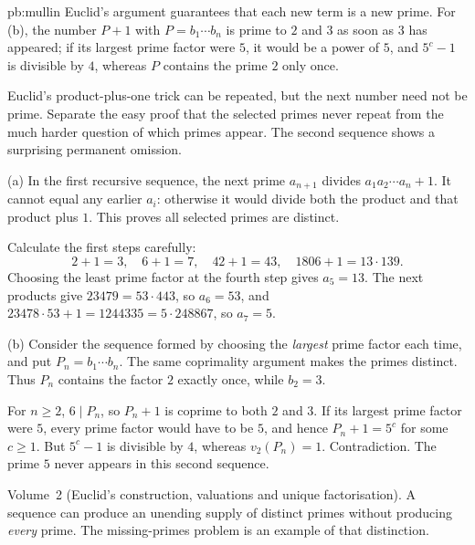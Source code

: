 \begin{solution}{pb:mullin}
\idea Euclid's argument guarantees that each new term is a new prime. For (b), the number $P+1$ with $P=b_1\cdots b_n$ is prime to
$2$ and $3$ as soon as $3$ has appeared; if its largest prime factor were $5$, it would be a power of $5$, and $5^c-1$ is
divisible by $4$, whereas $P$ contains the prime $2$ only once.

\writeup
Euclid's product-plus-one trick can be repeated, but the next number need not be prime. Separate the easy proof that the selected primes never repeat from the much harder question of which primes appear. The second sequence shows a surprising permanent omission.

 (a) In the first recursive sequence, the next prime $a_{n+1}$ divides
$a_1a_2\cdots a_n+1$. It cannot equal any earlier $a_i$: otherwise it would divide both the product and that product plus $1$. This proves all selected primes are distinct.

Calculate the first steps carefully:
\[
2+1=3,\quad6+1=7,\quad42+1=43,\quad
1806+1=13\cdot139.
\]
Choosing the least prime factor at the fourth step gives $a_5=13$. The next products give $23479=53\cdot443$, so $a_6=53$, and
$23478\cdot53+1=1244335=5\cdot248867$, so $a_7=5$.

(b) Consider the sequence formed by choosing the \emph{largest} prime factor each time, and put $P_n=b_1\cdots b_n$. The same coprimality argument makes the primes distinct. Thus $P_n$ contains the factor $2$ exactly once, while $b_2=3$.

For $n\ge2$, $6\mid P_n$, so $P_n+1$ is coprime to both $2$ and $3$. If its largest prime factor were $5$, every prime factor would have to be $5$, and hence $P_n+1=5^c$ for some $c\ge1$. But $5^c-1$ is divisible by $4$, whereas $v_2(P_n)=1$. Contradiction. The prime $5$ never appears in this second sequence.

\tools Volume~2 (Euclid's construction, valuations and unique factorisation).
\leads A sequence can produce an unending supply of distinct primes without producing \emph{every} prime. The missing-primes problem is an example of that distinction.
\end{solution}

